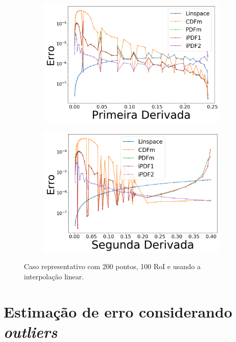 \begin{figure}[H]
	\begin{subfigure}[b]{0.45\textwidth}
		\centering 
		\includegraphics[width=\textwidth]{./figuras/error_normal_linear_Primeira Derivada.png}
		\caption{}
		\label{fig:11c}
	\end{subfigure}
	\hfill
	\begin{subfigure}[b]{0.45\textwidth}
		\centering 
		\includegraphics[width=\textwidth]{./figuras/error_normal_linear_Segunda Derivada.png}
		\caption{}
		\label{fig:11d}
	\end{subfigure}
	
	\caption{Caso representativo com 200 pontos, 100 \ac{RoI} e usando a interpolação linear.}\label{fig:11}
\end{figure}

\section{Estimação de erro considerando \textit{outliers}} \label{cap:erro_out}